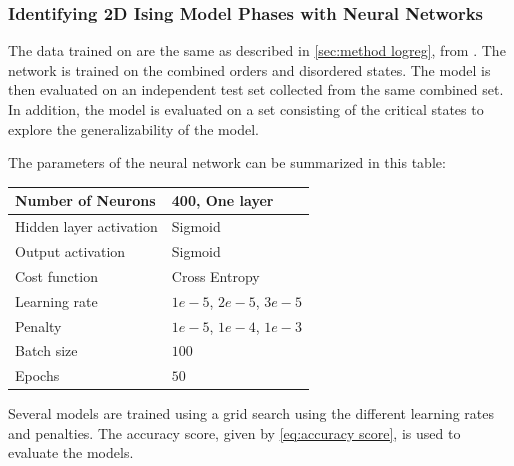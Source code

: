 \subsubsection{Identifying 2D Ising Model Phases with Neural Networks}
The data trained on are the same as described in \autoref{sec:method logreg}, from \cite{Mehta_2019}. The network is trained on the combined orders and disordered states. The model is then evaluated on an independent test set collected from the same combined set. In addition, the model is evaluated on a set consisting of the critical states to explore the generalizability of the model. 

The parameters of the neural network can be summarized in this table:

\begin{table}[H]
\begin{tabular}{|l|l|}
\hline
Number of Neurons & 400, One layer  \\ \hline
Hidden layer activation & Sigmoid   \\ \hline
Output activation & Sigmoid  \\ \hline
Cost function & Cross Entropy \\ \hline
Learning rate & $1e-5$, $2e-5$, $3e-5$  \\ \hline
Penalty & $1e-5$, $1e-4$, $1e-3$  \\ \hline
Batch size & $100$  \\ \hline
Epochs & $50$  \\ \hline
\end{tabular}
\end{table}

Several models are trained using a grid search using the different learning rates 
and penalties. The accuracy score, given by \autoref{eq:accuracy score}, is used to evaluate the models.
